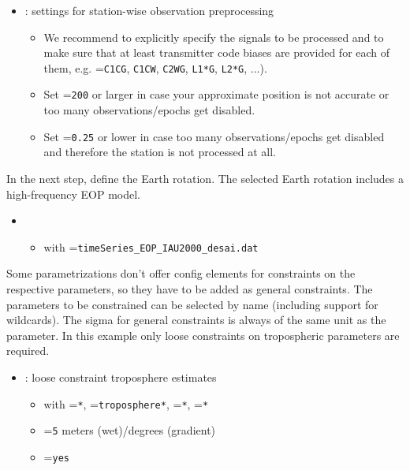 \begin{itemize}
\begin{itemize}
    \item {}: settings for station-wise observation preprocessing
    \begin{itemize}
      \item We recommend to explicitly specify the signals to be processed and to make sure that at least transmitter
            code biases are provided for each of them, e.g. =\verb|C1CG|,
            \verb|C1CW|, \verb|C2WG|, \verb|L1*G|, \verb|L2*G|, ...).
      \item Set =\verb|200| or larger in case your approximate position is not accurate or
            too many observations/epochs get disabled.
      \item Set =\verb|0.25| or lower in case too many observations/epochs get disabled
            and therefore the station is not processed at all.
    \end{itemize}
  \end{itemize}
\end{itemize}

In the next step, define the Earth rotation. The selected Earth rotation includes a high-frequency EOP model.
\begin{itemize}
  \item {}
  \begin{itemize}
    \item {}
          with =\verb|timeSeries_EOP_IAU2000_desai.dat|
  \end{itemize}
\end{itemize}

Some parametrizations don't offer config elements for constraints on the respective parameters, so they have to be added
as general constraints. The parameters to be constrained can be selected by name (including support for wildcards).
The sigma for general constraints is always of the same unit as the parameter.
In this example only loose constraints on tropospheric parameters are required.
\begin{itemize}
  \item {}: loose constraint troposphere estimates
  \begin{itemize}
    \item {} with =\verb|*|,
          =\verb|troposphere*|, =\verb|*|, =\verb|*|
    \item {}=\verb|5| meters (wet)/degrees (gradient)
    \item {}=\verb|yes|
  \end{itemize}
\end{itemize}

